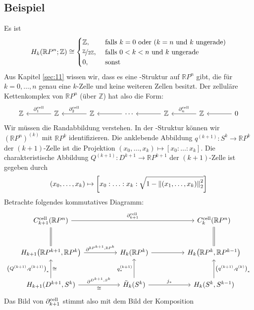 \subsection[Beispiel: Homologie von $\mathds{R}P^n$]{Beispiel} %
\label{sub:1213}
Es ist 
\[
	H_k(\mathds{R}P^n;\mathds{Z})\cong \begin{cases}
		\mathds{Z}, &\text{ falls }k=0 \text{ oder }(k=n \text{ und $k$ ungerade})\\
		\nicefrac{\mathds{Z}}{2 \mathds{Z}} ,&\text{ falls } 0<k<n \text{ und $k$ ungerade} \\
		0 ,&\text{ sonst}
	\end{cases}
\]
Aus Kapitel \ref{sec:11} wissen wir, dass es eine \CW-Struktur auf $\mathds{R}P^n$ gibt, die für $k=0,\ldots ,n$ genau eine $k$-Zelle und keine weiteren Zellen besitzt.
Der zelluläre Kettenkomplex von $\mathds{R}P^n$ (über $\mathds{Z}$) hat also die Form:
\[
	\begin{tikzcd}[column sep=large]
		\mathds{Z} & \mathds{Z} \lar["\partial_1^{\cell}"'] & \mathds{Z} \lar["\partial_2^{\cell}"'] & \cdots \lar & \mathds{Z} \lar & \mathds{Z} 
		\lar["\partial_n^{\cell}"'] & 0 \lar
	\end{tikzcd}
\]
Wir müssen die Randabbildung verstehen. In der \CW-Struktur können wir $(\mathds{R}P^n)^{(k)}$ mit $\mathds{R}P^k$ identifizieren. Die anklebende Abbildung 
$q^{(k+1)} \colon S^k \to \mathds{R}P^k$ der $(k+1)$-Zelle ist die Projektion $(x_0, \ldots ,x_k) \mapsto [x_0 : \ldots : x_k]$. Die charakteristische Abbildung 
$Q^{(k+1)} \colon D^{k+1} \to \mathds{R}P^{k+1}$ der $(k+1)$-Zelle ist gegeben durch 
\[
	(x_0, \ldots ,x_k) \mapsto \benbrace*{x_0 : \ldots : x_k : \sqrt{\cramped 1- \norm[2]{(x_1,\ldots, x_k)}^2}} 
\]
Betrachte folgendes kommutatives Diagramm:
\[
	\begin{tikzcd}[column sep=huge, row sep=large]
		C_{k+1}^{\cell}(\mathds{R}P^n) \arrow[rr,"\partial_{k+1}^{\cell}"] \dar[equal] & & C_k^{\cell}(\mathds{R}P^n) \dar[equal]\\
		H_{k+1} \enbrace*{\mathds{R}P^{k+1},\mathds{R}P^k} \rar["\partial^{\mathds{R}P^{k+1},\mathds{R}P^k}"] & H_k(\mathds{R}P^k) \rar
		& H_k \enbrace*{\mathds{R}P^k,\mathds{R}P^{k-1}} \\
		H_{k+1}(D^{k+1},S^k) \uar["\enbrace*{Q^{(k+1)},q^{(k+1)}}_*","\cong"'] \rar["\partial^{D^{k+1},S^k}","\cong"'] & \tilde{H}_k(S^k) \uar["q^{(k+1)}_*"] \rar["j_*"] 
		& H_k(S^k,S^{k-1}) \uar["\enbrace*{q^{(k+1)},q^{(k)}}_*"']
	\end{tikzcd}
\]
Das Bild von $\partial_{k+1}^{\cell}$ stimmt also mit dem Bild der Komposition 
